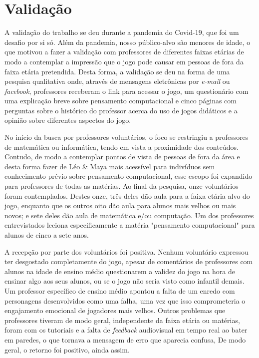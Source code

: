 \documentclass[conference]{IEEEtran}
\begin{document}
\section{Validação}

A validação do trabalho se deu durante a pandemia do Covid-19, que foi um desafio por si só. Além da pandemia, nosso público-alvo são menores de idade, o que motivou a fazer a validação com professores de diferentes faixas etárias de modo a contemplar a impressão que o jogo pode causar em pessoas de fora da faixa etária pretendida. Desta forma, a validação se deu na forma de uma pesquisa qualitativa onde, através de mensagens eletrônicas por \textit{e-mail} ou \textit{facebook}, professores receberam o link para acessar o jogo, um questionário com uma explicação breve sobre pensamento computacional e cinco páginas com perguntas sobre o histórico do professor acerca do uso de jogos didáticos e a opinião sobre diferentes aspectos do jogo. 

No início da busca por professores voluntários, o foco se restringiu a professores de matemática ou informática, tendo em vista a proximidade dos conteúdos. Contudo, de modo a contemplar pontos de vista de pessoas de fora da área e desta forma fazer de Léo \& Maya mais acessível para indivíduos sem conhecimento prévio sobre pensamento computacional, esse escopo foi expandido para professores de todas as matérias. Ao final da pesquisa, onze voluntários foram contemplados. Destes onze, três deles dão aula para a faixa etária alvo do jogo, enquanto que os outros oito dão aula para alunos mais velhos ou mais novos; e sete deles dão aula de matemática e/ou computação. Um dos professores entrevistados leciona especificamente a matéria "pensamento computacional" para alunos de cinco a sete anos.

A recepção por parte dos voluntários foi positiva. Nenhum voluntário expressou ter desgostado completamente do jogo, apesar de comentários de professores com alunos na idade de ensino médio questionarem a validez do jogo na hora de ensinar algo aos seus alunos, ou se o jogo não seria visto como infantil demais. Um professor específico de ensino médio apontou a falta de um enredo com personagens desenvolvidos como uma falha, uma vez que isso comprometeria o engajamento emocional de jogadores mais velhos. Outros problemas que professores tiveram de modo geral, independente da faixa etária ou matérias, foram com os tutoriais e a falta de \textit{feedback} audiovisual em tempo real ao bater em paredes, o que tornava a mensagem de erro que aparecia confusa, De modo geral, o retorno foi positivo, ainda assim.
\end{document}
